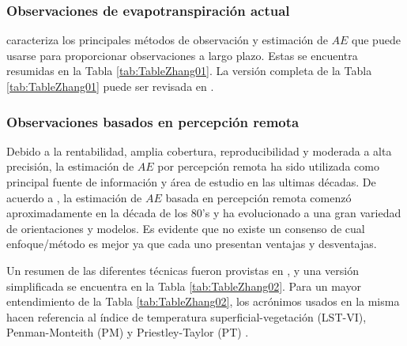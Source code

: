\documentclass[12pt]{article}
\begin{document}
\clearpage

\clearpage

\subsubsection{Observaciones de evapotranspiración actual}

\citet{wang2012review} caracteriza los principales métodos de observación y estimación de $AE$ que puede usarse para proporcionar observaciones a largo plazo. Estas se encuentra resumidas en la Tabla \ref{tab:TableZhang01}. La versión completa de la Tabla \ref{tab:TableZhang01} puede ser revisada en \citet{wang2012review}.

\vspace{.5cm}

\thispagestyle{empty}

\subsubsection{Observaciones basados en percepción remota}

Debido a la rentabilidad, amplia cobertura, reproducibilidad y moderada a alta precisión, la estimación de $AE$ por percepción remota ha sido utilizada como principal fuente de información y área de estudio en las ultimas décadas. De acuerdo a \citet{zhang2016review}, la estimación de $AE$ basada en percepción remota comenzó aproximadamente en la década de los 80's y ha evolucionado a una gran variedad de orientaciones y modelos. Es evidente que no existe un consenso de cual enfoque/método es mejor ya que cada uno presentan ventajas y desventajas. 

\thispagestyle{empty}

Un resumen de las diferentes técnicas fueron provistas en \citet{zhang2016review}, y una versión simplificada se encuentra en la Tabla \ref{tab:TableZhang02}. Para un mayor entendimiento de la Tabla \ref{tab:TableZhang02}, los acrónimos usados en la misma hacen referencia al índice de temperatura superficial-vegetación (LST-VI), Penman-Monteith (PM) \citep{penman1948natural,monteith1965evaporation} y Priestley-Taylor (PT) \citep{priestley1972assessment}.

\vspace{.5cm}

\thispagestyle{empty}

\end{document}
